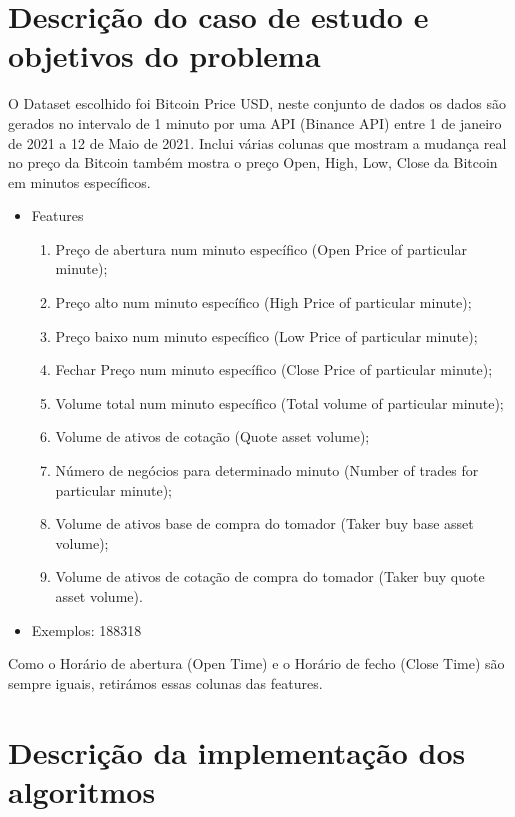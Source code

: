 \documentclass[10pt]{article}
\begin{document}
\vspace{4cm}
\section{Descrição do caso de estudo e objetivos do problema}\label{sec:apre-da-org}
O Dataset escolhido foi Bitcoin Price USD, neste conjunto de dados os dados são gerados no intervalo 
de 1 minuto por uma API (Binance API) entre 1 de janeiro de 2021 a 12 de Maio de 2021.
Inclui várias colunas que mostram a mudança real no preço da Bitcoin também mostra o preço Open, High,
Low, Close da Bitcoin em minutos específicos. 
\begin{itemize}
    \item{Features}
    \begin{enumerate}
        \item Preço de abertura num minuto específico (Open Price of particular minute);
        \item Preço alto num minuto específico (High Price of particular minute);
        \item Preço baixo num minuto específico (Low Price of particular minute);
        \item Fechar Preço num minuto específico (Close Price of particular minute);
        \item Volume total num minuto específico (Total volume of particular minute);
        \item Volume de ativos de cotação (Quote asset volume);
        \item Número de negócios para determinado minuto (Number of trades for particular minute);
        \item Volume de ativos base de compra do tomador (Taker buy base asset volume);
        \item Volume de ativos de cotação de compra do tomador (Taker buy quote asset volume).
    \end{enumerate}
\end{itemize}
\begin{itemize}
    \item{Exemplos: 188318}
\end{itemize}   
Como o Horário de abertura (Open Time) e o Horário de fecho (Close Time) são sempre iguais, retirámos essas colunas das features.
\newpage
\section{Descrição da implementação dos algoritmos}\label{sec:ev-da-org}
\end{document}
